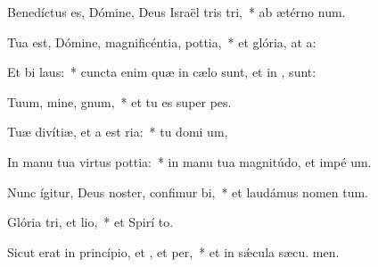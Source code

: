 \item Benedíctus es, Dómine, Deus Israël tris tri,~* ab ætérno  num.
\item Tua est, Dómine, magnificéntia,  pottia,~* et glória, at a:
\item Et bi laus:~* cuncta enim quæ in cælo sunt, et in ,  sunt:
\item Tuum, mine, gnum,~* et tu es super  pes.
\item Tuæ divítiæ, et a est ria:~* tu domi um,
\item In manu tua virtus  pottia:~* in manu tua magnitúdo, et impé um.
\item Nunc ígitur, Deus noster, confimur bi,~* et laudámus nomen  tum.
\item Glória tri, et lio,~* et Spirí to.
\item Sicut erat in princípio, et , et per,~* et in sǽcula sæcu. men.
